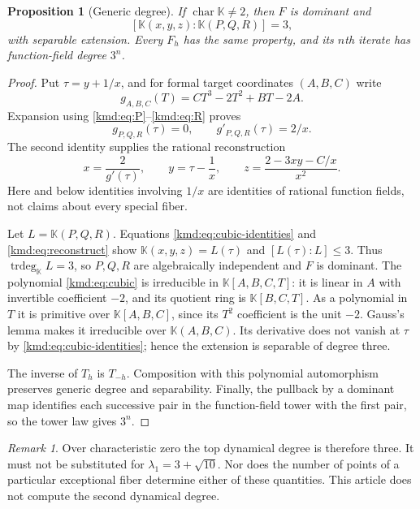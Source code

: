 \documentclass[11pt,a4paper]{article}
\numberwithin{equation}{section}
\newtheorem{proposition}[theorem]{Proposition}
\theoremstyle{definition}
\theoremstyle{remark}
\newtheorem{remark}[theorem]{Remark}
\newcommand{\K}{\mathbb K}
\DeclareMathOperator{\charac}{char}
\begin{document}
\begin{proposition}[Generic degree]\label{kmd:prop:generic}
If $\charac\K\ne2$, then $F$ is dominant and
\[
 [\K(x,y,z):\K(P,Q,R)]=3,
\]
with separable extension. Every $F_h$ has the same property, and its
$n$th iterate has function-field degree $3^n$.
\end{proposition}
\begin{proof}
Put $\tau=y+1/x$, and for formal target coordinates $(A,B,C)$ write
\begin{equation}
 g_{A,B,C}(T)=CT^3-2T^2+BT-2A.
 \label{kmd:eq:cubic}
\end{equation}
Expansion using \eqref{kmd:eq:P}--\eqref{kmd:eq:R} proves
\begin{equation}
 g_{P,Q,R}(\tau)=0,\qquad g'_{P,Q,R}(\tau)=2/x.
 \label{kmd:eq:cubic-identities}
\end{equation}
The second identity supplies the rational reconstruction
\begin{equation}
 x=\frac2{g'(\tau)},\qquad y=\tau-\frac1x,
 \qquad z=\frac{2-3xy-C/x}{x^2}.
 \label{kmd:eq:reconstruct}
\end{equation}
Here and below identities involving $1/x$ are identities of rational
function fields, not claims about every special fiber.

Let $L=\K(P,Q,R)$. Equations \eqref{kmd:eq:cubic-identities} and
\eqref{kmd:eq:reconstruct} show $\K(x,y,z)=L(\tau)$ and $[L(\tau):L]\le3$.
Thus $\operatorname{trdeg}_\K L=3$, so $P,Q,R$ are algebraically
independent and $F$ is dominant. The polynomial \eqref{kmd:eq:cubic} is
irreducible in $\K[A,B,C,T]$: it is linear in $A$ with invertible
coefficient $-2$, and its quotient ring is $\K[B,C,T]$. As a polynomial
in $T$ it is primitive over $\K[A,B,C]$, since its $T^2$ coefficient
is the unit $-2$. Gauss's lemma makes it irreducible over
$\K(A,B,C)$. Its derivative does not vanish at $\tau$ by
\eqref{kmd:eq:cubic-identities}; hence the extension is separable of degree
three.

The inverse of $T_h$ is $T_{-h}$. Composition with this polynomial
automorphism preserves generic degree and separability. Finally, the
pullback by a dominant map identifies each successive pair in the
function-field tower with the first pair, so the tower law gives
$3^n$.
\end{proof}

\begin{remark}
Over characteristic zero the top dynamical degree is therefore three.
It must not be substituted for $\lambda_1=3+\sqrt{10}$. Nor does the
number of points of a particular exceptional fiber determine either
of these quantities. This article does not compute the second
dynamical degree.
\end{remark}
\end{document}

